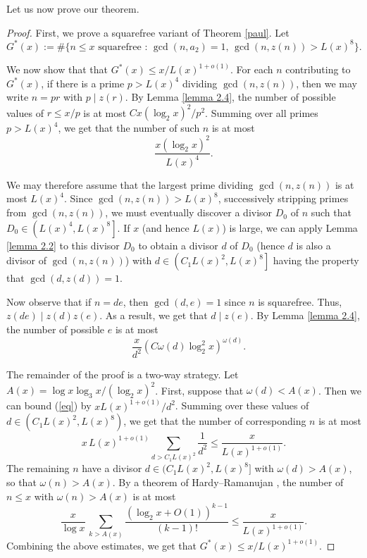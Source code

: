 \documentclass[12pt,a4paper,oneside]{amsart}
\begin{document}
Let us now prove our theorem.
\begin{proof}
First, we prove a squarefree variant of Theorem \ref{paul}. Let \[G^{*}(x) := \#\{n \le x\text{ squarefree } :\, \gcd(n,a_{2})=1,\, \gcd(n,z(n))>L(x)^{8}\}.\]

We now show that that $G^{*}(x) \le x/L(x)^{1+o(1)}$. 
For each $n$ contributing to $G^\ast(x)$, if there is a prime $p>L(x)^{4}$ dividing $\gcd(n,z(n))$, then we may write $n=pr$ with $p\mid z(r)$. By Lemma \ref{lemma 2.4}, the number of possible values of $r\le x/p$ is at most $Cx (\log_{2} x)^{2} /p^{2}$. Summing over all primes $p>L(x)^{4}$, we get that the number of such $n$ is at most \[\frac{x (\log_{2} x)^{2}}{L(x)^{4}}.\]

We may therefore assume that the largest prime dividing $\gcd(n,z(n))$ is at most $L(x)^{4}$. Since $\gcd(n,z(n)) > L(x)^{8}$,
successively stripping primes from $\gcd(n,z(n))$, we must eventually discover a divisor $D_0$ of $n$ such that $D_0 \in \left(L(x)^{4}, L(x)^{8}\right]$. If $x$ (and hence $L(x)$) is large, we can apply Lemma \ref{lemma 2.2} to this divisor $D_0$ to obtain a divisor $d$ of $D_0$ (hence $d$ is also a divisor of $\gcd(n,z(n))$) with $d \in \left(C_1L(x)^{2}, L(x)^{8}\right]$ having the property that $\gcd(d, z(d)) = 1$.

Now observe that if $n=de$, then $\gcd(d,e)=1$ since $n$ is squarefree. Thus, $z(de)\mid z(d) z(e)$. As a result, we get that $d\mid z(e)$. By Lemma \ref{lemma 2.4}, the number of possible $e$ is at most \begin{equation}\label{eq}
 \quad \frac{x}{d^{2}} (C\omega(d) \log_{2}^{2} x)^{\omega(d)}.
\end{equation}

The remainder of the proof is a two-way strategy. Let $A(x)=\log x \log_{3} x/(\log_2 x)^{2}$. First, suppose that $\omega(d)<A(x)$. Then we can bound (\ref{eq}) by $xL(x)^{1+o(1)}/d^{2}$. Summing over these values of $d\in \left(C_1L(x)^{2}, L(x)^{8}\right)$, we get that the number of corresponding $n$ is at most \[x\,L(x)^{1+o(1)}\sum_{d>C_1L(x)^{2}}\frac1{d^{2}}\le \frac{x}{L(x)^{1+o(1)}}.\] The remaining $n$ have a divisor $d\in (C_1L(x)^{2},L(x)^{8}]$ with $\omega(d)>A(x)$, so that $\omega(n)>A(x)$. By a theorem of Hardy--Ramanujan \cite{HR17}, the number of $n\le x$ with $\omega(n)>A(x)$ is at most \[\frac{x}{\log x}\, \sum_{k>A(x)} \frac{(\log_2 x +O(1))^{k-1}}{(k-1)!}\le \frac{x}{L(x)^{1+o(1)}}.\] Combining the above estimates, we get that $G^{*}(x)\le x/L(x)^{1+o(1)}$.


\end{proof}
\end{document}
